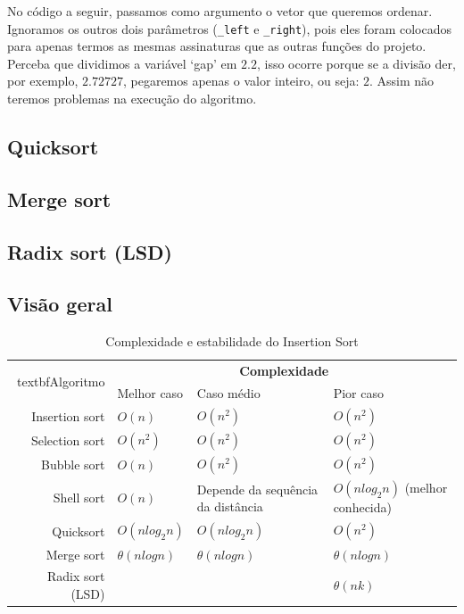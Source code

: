 No código a seguir, passamos como argumento o vetor que queremos ordenar. Ignoramos os outros dois parâmetros (\texttt{\_left} e \texttt{\_right}), pois eles foram colocados para apenas termos as mesmas assinaturas que as outras funções do projeto. Perceba que dividimos a variável `gap' em $2.2$, isso ocorre porque se a divisão der, por exemplo, $2.72727$, pegaremos apenas o valor inteiro, ou seja: $2$. Assim não teremos problemas na execução do algoritmo.



\subsection{Quicksort}
\subsection{Merge sort}
\subsection{Radix sort (LSD)}

\subsection{Visão geral}
\begin{table}[H]
 \centering
	\begin{tabular}{| r | p{2.5cm} | p{2.5cm} | p{2.5cm} |}
		\hline
		\multirow{2}{*}{textbf{Algoritmo}} & \multicolumn{3}{c|}{\textbf{Complexidade}} \\
		 & Melhor caso   & Caso médio & Pior caso \\
		\hline
		Insertion sort   & $O(n)$          & $O(n^{2})$                        & $O(n^{2})$ \\
		\hline
		Selection sort   & $O(n^{2})$      & $O(n^{2})$                        & $O(n^{2})$ \\
		\hline
		Bubble sort      & $O(n)$          & $O(n^{2})$                        & $O(n^{2})$ \\
		\hline
		Shell sort       & $O(n)$          & Depende da sequência da distância & $O(nlog_{2}n)$ (melhor conhecida) \\
		\hline
		Quicksort        & $O(nlog_{2}n)$  & $O(nlog_{2}n)$                    & $O(n^{2})$ \\
		\hline
		Merge sort       & $\theta(nlogn)$ & $\theta(nlogn)$                   & $\theta(nlogn)$ \\
		\hline
		Radix sort (LSD) &                 &                                   & $\theta(nk)$ \\
		\hline
	\end{tabular}
	\caption{Complexidade e estabilidade do Insertion Sort}
	\label{t_insertion_sort}
\end{table}

